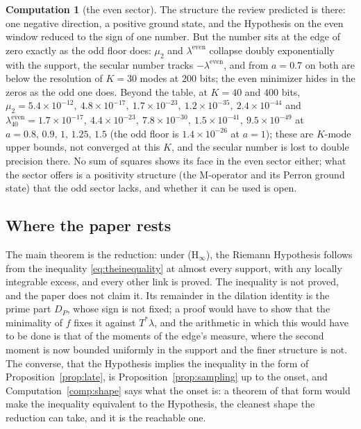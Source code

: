 \documentclass[11pt]{article}
\theoremstyle{definition}
\newtheorem{computation}[theorem]{Computation}
\theoremstyle{remark}
\newcommand{\Tst}{T^{*}}
\begin{document}
\begin{computation}[the even sector]
The structure the review predicted is there: one negative direction, a positive ground state, and the Hypothesis on the even window reduced to the sign of one number. But the number sits at the edge of zero exactly as the odd floor does: $\mu_2$ and $\lambda^{\mathrm{even}}$ collapse doubly exponentially with the support, the secular number tracks $-\lambda^{\mathrm{even}}$, and from $a=0.7$ on both are below the resolution of $K=30$ modes at $200$ bits; the even minimizer hides in the zeros as the odd one does. Beyond the table, at $K=40$ and $400$ bits, $\mu_2=5.4\times10^{-12},\ 4.8\times10^{-17},\ 1.7\times10^{-23},\ 1.2\times10^{-35},\ 2.4\times10^{-44}$ and $\lambda^{\mathrm{even}}_{40}=1.7\times10^{-17},\ 4.4\times10^{-23},\ 7.8\times10^{-30},\ 1.5\times10^{-41},\ 9.5\times10^{-49}$ at $a=0.8,\,0.9,\,1,\,1.25,\,1.5$ (the odd floor is $1.4\times10^{-26}$ at $a=1$); these are $K$-mode upper bounds, not converged at this $K$, and the secular number is lost to double precision there. No sum of squares shows its face in the even sector either; what the sector offers is a positivity structure (the M-operator and its Perron ground state) that the odd sector lacks, and whether it can be used is open.
\end{computation}




\subsection*{Where the paper rests}
The main theorem is the reduction: under (H$_\infty$), the Riemann Hypothesis follows from the inequality \eqref{eq:theinequality} at almost every support, with any locally integrable excess, and every other link is proved. The inequality is not proved, and the paper does not claim it. Its remainder in the dilation identity is the prime part $D_P$, whose sign is not fixed; a proof would have to show that the minimality of $f$ fixes it against $\Tst\lambda$, and the arithmetic in which this would have to be done is that of the moments of the edge's measure, where the second moment is now bounded uniformly in the support and the finer structure is not. The converse, that the Hypothesis implies the inequality in the form of Proposition~\ref{prop:late}, is Proposition~\ref{prop:sampling} up to the onset, and Computation~\ref{comp:shape} says what the onset is: a theorem of that form would make the inequality equivalent to the Hypothesis, the cleanest shape the reduction can take, and it is the reachable one.
\end{document}
